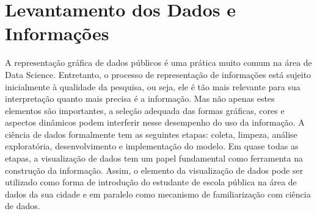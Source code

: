 \documentclass[
]{book}
\begin{document}
\hypertarget{levantamento-dos-dados-e-informauxe7uxf5es}{%
\section{Levantamento dos Dados e Informações}\label{levantamento-dos-dados-e-informauxe7uxf5es}}

A representação gráfica de dados públicos é uma prática muito comum na área de Data Science. Entretanto, o processo de representação de informações está sujeito inicialmente à qualidade da pesquisa, ou seja, ele é tão mais relevante para sua interpretação quanto mais precisa é a informação. Mas não apenas estes elementos são importantes, a seleção adequada das formas gráficas, cores e aspectos dinâmicos podem interferir nesse desempenho do uso da informação. A ciência de dados formalmente tem as seguintes etapas: coleta, limpeza, análise exploratória, desenvolvimento e implementação do modelo. Em quase todas as etapas, a visualização de dados tem um papel fundamental como ferramenta na construção da informação. Assim, o elemento da visualização de dados pode ser utilizado como forma de introdução do estudante de escola pública na área de dados da sua cidade e em paralelo como mecanismo de familiarização com ciência de dados.
\end{document}
